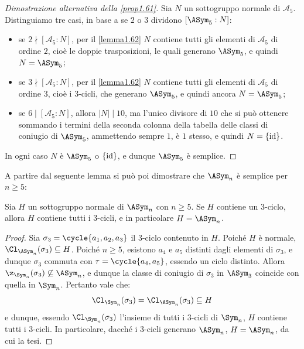 \documentclass[11pt]{scrartcl}
\begin{document}
	\begin{proof}[Dimostrazione alternativa della \autoref{prop1.61}]
		Sia $N$ un sottogruppo normale di $\mathcal{A}_5$.
		Distinguiamo tre casi, in base a se $2$ o $3$ dividono $[\ASym_5 : N]$:
		\begin{itemize}
			\item se $2 \nmid [\mathcal{A}_5:N]$, per il \autoref{lemma1.62}
			$N$ contiene tutti gli elementi di 
			$\mathcal{A}_5$ di ordine $2$, cioè le doppie trasposizioni, le quali
			generano $\ASym_5$, e quindi $N = \ASym_5$;
			\item se $3\nmid [\mathcal{A}_5:N]$, per il \autoref{lemma1.62}
			$N$ contiene tutti gli elementi di 
			$\mathcal{A}_5$ di ordine $3$, cioè i $3$-cicli, che generano
			$\ASym_5$, e quindi ancora $N = \ASym_5$;
			\item se $6 \mid [\mathcal{A}_5:N]$, allora $\lvert N \rvert \mid 10$, ma l'unico
			divisore di $10$ che si può ottenere sommando i termini della seconda
			colonna della tabella delle classi di coniugio di $\ASym_5$, ammettendo
			sempre $1$, è $1$ stesso, e quindi $N = \{\mathrm{id}\}$.
		\end{itemize}
		In ogni caso $N$ è $\ASym_5$ o $\{\mathrm{id}\}$, e dunque $\ASym_5$ è semplice.
	\end{proof}
	
	A partire dal seguente lemma si può poi dimostrare che $\ASym_n$ è semplice per $n \geq 5$:
	
	\begin{lemma}
		\label{lemma1.79}
		Sia $H$ un sottogruppo normale di $\ASym_n$ con $n \geq 5$. Se $H$ contiene un $3$-ciclo,
		allora $H$ contiene tutti i $3$-cicli, e in particolare $H = \ASym_n$.
	\end{lemma}
	
	\begin{proof}
		Sia $\sigma_3 = \cycle{a_1, a_2, a_3}$ il $3$-ciclo contenuto in $H$. Poiché $H$ è normale,
		$\Cl_{\ASym_n}(\sigma_3) \subseteq H$. Poiché $n \geq 5$, esistono $a_4$ e $a_5$ distinti dagli elementi di $\sigma_3$, e dunque $\sigma_3$ commuta con $\tau = \cycle{a_4, a_5}$, essendo un ciclo distinto. Allora $\z_{\Sym_n}(\sigma_3) \not\subseteq \ASym_n$, e dunque la classe di coniugio di
		$\sigma_3$ in $\ASym_3$ coincide con quella in $\Sym_n$. Pertanto vale che:
		\[ \Cl_{\Sym_n}(\sigma_3) = \Cl_{\ASym_n}(\sigma_3) \subseteq H \]
		e dunque, essendo $\Cl_{\Sym_n}(\sigma_3)$ l'insieme di tutti i $3$-cicli di
		$\Sym_n$, $H$ contiene tutti i $3$-cicli. In particolare, dacché i $3$-cicli
		generano $\ASym_n$, $H = \ASym_n$, da cui la tesi.
	\end{proof}
	
\end{document}
